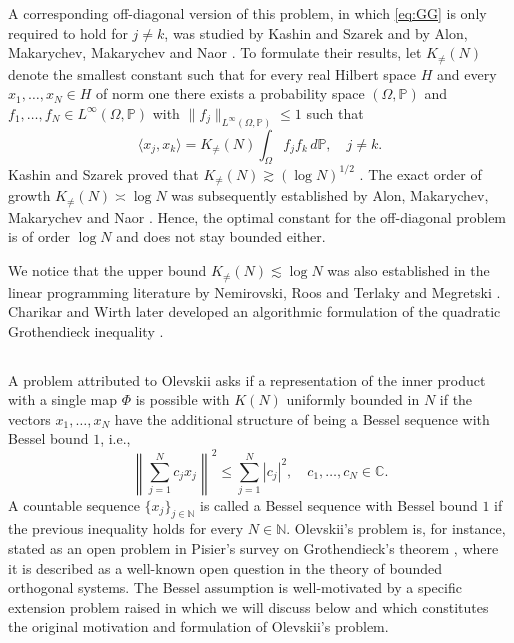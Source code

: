\documentclass[reqno,a4paper,12pt]{amsart}
\numberwithin{equation}{section}
\def\N{{\mathbb N}}
\def\C{{\mathbb C}}
\newcommand\1{\mathds{1}}
\begin{document}
A corresponding off-diagonal version of this problem, in which \eqref{eq:GG} is only required to hold for $j \neq k$, was studied by Kashin and Szarek \cite{kashinSzarek2003knaster,kashinSzarek2003gram} and by Alon, Makarychev, Makarychev and Naor \cite{alonEtAl2006quadratic}. To formulate their results, let $K_{\neq}(N)$ denote the smallest constant such that for every real Hilbert space $H$ and every $x_1, \dots, x_N \in H$ of norm one there exists a probability space $(\Omega, \mathbb P)$ and $f_1, \dots, f_N \in L^\infty(\Omega,\mathbb P)$ with $\|f_j\|_{L^\infty(\Omega,\mathbb P)}\leq 1$ such that
$$
\langle x_j,x_k\rangle = K_{\neq}(N) \int_\Omega f_j f_k \, d\mathbb P, \quad j \neq k.
$$
Kashin and Szarek proved that $K_{\neq}(N) \gtrsim (\log N)^{1/2}$ \cite{kashinSzarek2003knaster,kashinSzarek2003gram}. The exact order of growth $K_{\neq}(N) \asymp \log N$ was subsequently established by Alon, Makarychev, Makarychev and Naor \cite{alonEtAl2006quadratic}. Hence, the optimal constant for the off-diagonal problem is of order $\log N$ and does not stay bounded either.

We notice that the upper bound $K_{\neq}(N) \lesssim \log N$ was also established in the linear programming literature by Nemirovski, Roos and Terlaky \cite{nemirovskiRoosTerlaky1999} and Megretski \cite{megretski2001}. Charikar and Wirth later developed an algorithmic formulation of the quadratic Grothendieck inequality \cite{charikarWirth2004}. 

\subsection{}\label{Olevskii}
A problem attributed to Olevskii asks if a representation of the inner product with a single map $\Phi$ is possible with $K(N)$ uniformly bounded in $N$ if the vectors $x_1 , \dots, x_N$ have the additional structure of being a Bessel sequence with Bessel bound $1$, i.e.,
$$
\left\|
\sum_{j=1}^N c_jx_j
\right\|^2
\leq
\sum_{j=1}^N|c_j|^2, \quad c_1, \dots, c_N \in \C.
$$
A countable sequence $\{ x_j \}_{j \in \N}$ is called a Bessel sequence with Bessel bound $1$ if the previous inequality holds for every $N\in\N$.
Olevskii's problem is, for instance, stated as an open problem in Pisier's survey on Grothendieck's theorem \cite[Remark 3.7, p.~257]{pisier2012grothendieck}, where it is described as a well-known open question in the theory of bounded orthogonal systems.
The Bessel assumption is well-motivated by a specific extension problem raised in \cite[p.~58]{Olevskii} which we will discuss below and which constitutes the original motivation and formulation of Olevskii's problem.
\end{document}
